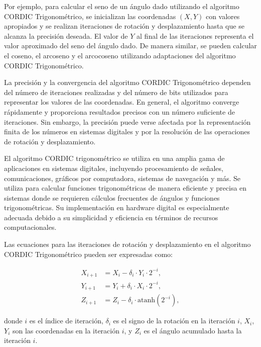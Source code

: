 \documentclass[12pt,a4paper, twoside]{article} %
\begin{document}
Por ejemplo, para calcular el seno de un ángulo dado utilizando el algoritmo CORDIC Trigonométrico, se inicializan las coordenadas $(X, Y)$ con valores apropiados y se realizan iteraciones de rotación y desplazamiento hasta que se alcanza la precisión deseada. El valor de $Y$ al final de las iteraciones representa el valor aproximado del seno del ángulo dado. De manera similar, se pueden calcular el coseno, el arcoseno y el arcocoseno utilizando adaptaciones del algoritmo CORDIC Trigonométrico.

La precisión y la convergencia del algoritmo CORDIC Trigonométrico dependen del número de iteraciones realizadas y del número de bits utilizados para representar los valores de las coordenadas. En general, el algoritmo converge rápidamente y proporciona resultados precisos con un número suficiente de iteraciones. Sin embargo, la precisión puede verse afectada por la representación finita de los números en sistemas digitales y por la resolución de las operaciones de rotación y desplazamiento.

El algoritmo CORDIC trigonométrico se utiliza en una amplia gama de aplicaciones en sistemas digitales, incluyendo procesamiento de señales, comunicaciones, gráficos por computadora, sistemas de navegación y más. Se utiliza para calcular funciones trigonométricas de manera eficiente y precisa en sistemas donde se requieren cálculos frecuentes de ángulos y funciones trigonométricas. Su implementación en hardware digital es especialmente adecuada debido a su simplicidad y eficiencia en términos de recursos computacionales.

Las ecuaciones para las iteraciones de rotación y desplazamiento en el algoritmo CORDIC Trigonométrico pueden ser expresadas como:

\begin{equation}
    \begin{aligned}
        X_{i+1} &= X_i - \delta_i \cdot Y_i \cdot 2^{-i}, \\
        Y_{i+1} &= Y_i + \delta_i \cdot X_i \cdot 2^{-i}, \\
        Z_{i+1} &= Z_i - \delta_i \cdot \text{atanh}(2^{-i}),
    \end{aligned}
\end{equation}

donde $i$ es el índice de iteración, $\delta_i$ es el signo de la rotación en la iteración $i$, $X_i$, $Y_i$ son las coordenadas en la iteración $i$, y $Z_i$ es el ángulo acumulado hasta la iteración $i$.  
\end{document}
